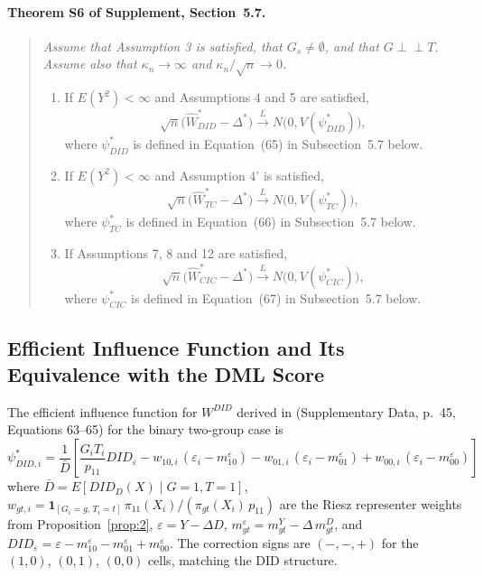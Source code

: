 \paragraph{Theorem S6 of \citet{fuzzy2018} Supplement, Section~5.7.}\label{thm:cdh_s6}
\begin{quote}\itshape
Assume that Assumption 3 is satisfied, that $G_s \neq \emptyset$, and that $G \perp\!\!\!\perp T$. Assume also that $\kappa_n \to \infty$ and $\kappa_n / \sqrt{n} \to 0$.
\begin{enumerate}
\item If $E(Y^2) < \infty$ and Assumptions 4 and 5 are satisfied,
\[
\sqrt{n}\bigl(\widehat{W}^{*}_{DID} - \Delta^*\bigr) \xrightarrow{L} N\bigl(0, V(\psi^{*}_{DID})\bigr),
\]
where $\psi^{*}_{DID}$ is defined in Equation~(65) in Subsection~5.7 below.
\item If $E(Y^2) < \infty$ and Assumption 4' is satisfied,
\[
\sqrt{n}\bigl(\widehat{W}^{*}_{TC} - \Delta^*\bigr) \xrightarrow{L} N\bigl(0, V(\psi^{*}_{TC})\bigr),
\]
where $\psi^{*}_{TC}$ is defined in Equation~(66) in Subsection~5.7 below.
\item If Assumptions 7, 8 and 12 are satisfied,
\[
\sqrt{n}\bigl(\widehat{W}^{*}_{CIC} - \Delta^*\bigr) \xrightarrow{L} N\bigl(0, V(\psi^{*}_{CIC})\bigr),
\]
where $\psi^{*}_{CIC}$ is defined in Equation~(67) in Subsection~5.7 below.
\end{enumerate}
\end{quote}

\subsection{Efficient Influence Function and Its Equivalence with the DML Score}\label{sec:app_cdh_equiv}

The efficient influence function for $W^{DID}$ derived in \cite{fuzzy2018} (Supplementary Data, p.~45, Equations 63--65) for the binary two-group case is
\begin{equation}\label{eq:cdh_if}
\psi^*_{DID,i} = \frac{1}{\bar{D}} \left[\frac{G_i T_i}{p_{11}} DID_\varepsilon - w_{10,i}\,(\varepsilon_i - m^\varepsilon_{10}) - w_{01,i}\,(\varepsilon_i - m^\varepsilon_{01}) + w_{00,i}\,(\varepsilon_i - m^\varepsilon_{00})\right]
\end{equation}
where $\bar{D} = E[DID_D(X) \mid G\!=\!1, T\!=\!1]$, $w_{gt,i} = \mathbf{1}_{[G_i=g,\,T_i=t]}\,\pi_{11}(X_i)/(\pi_{gt}(X_i)\,p_{11})$ are the Riesz representer weights from Proposition~\ref{prop:2}, $\varepsilon = Y - \Delta D$, $m^\varepsilon_{gt} = m^Y_{gt} - \Delta\, m^D_{gt}$, and $DID_\varepsilon = \varepsilon - m^\varepsilon_{10} - m^\varepsilon_{01} + m^\varepsilon_{00}$. The correction signs are $(-,-,+)$ for the $(1,0)$, $(0,1)$, $(0,0)$ cells, matching the DID structure.

